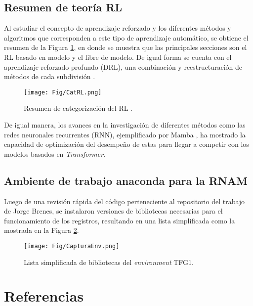 \documentclass[12pt]{article}
\begin{document}
\subsection*{Resumen de teoría RL}

Al estudiar el concepto de aprendizaje reforzado y los diferentes métodos y algoritmos que corresponden a este tipo de aprendizaje automático, se obtiene el resumen de la Figura \ref{fig:teoriaRL}, en donde se muestra que las principales secciones son el RL basado en modelo y el libre de modelo. De igual forma se cuenta con el aprendizaje reforzado profundo (DRL), una combinación y reestructuración de métodos de cada subdivisión \cite{DataScience}.

\begin{figure}[hh]
	\centering
	\texttt{[image: Fig/CatRL.png]}
	\caption{Resumen de categorización del RL \cite{DataScience}.}
	\label{fig:teoriaRL}
\end{figure}


De igual manera, los avances en la investigación de diferentes métodos como las redes neuronales recurrentes (RNN), ejemplificado por Mamba \cite{Mamba}, ha mostrado la capacidad de optimización del desempeño de estas para llegar a competir con los modelos basados en \textit{Transformer}.


\subsection*{Ambiente de trabajo anaconda para la RNAM}

Luego de una revisión rápida del código perteneciente al repositorio del trabajo de Jorge Brenes, se instalaron versiones de bibliotecas necesarias para el funcionamiento de los registros, resultando en una lista simplificada como la mostrada en la Figura \ref{fig:capturaenv}.

\begin{figure}[h]
	\centering
	\texttt{[image: Fig/CapturaEnv.png]}
	\caption{Lista simplificada de bibliotecas del \textit{environment} TFG1.}
	\label{fig:capturaenv}
\end{figure}



\newpage

\section*{Referencias}
\renewcommand\refname{}


\end{document}

